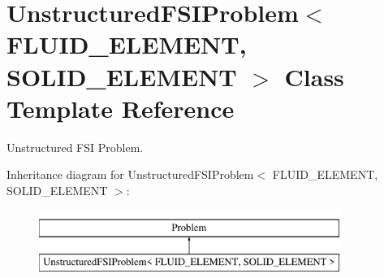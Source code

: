 \hypertarget{classUnstructuredFSIProblem}{}\section{Unstructured\+F\+S\+I\+Problem$<$ F\+L\+U\+I\+D\+\_\+\+E\+L\+E\+M\+E\+NT, S\+O\+L\+I\+D\+\_\+\+E\+L\+E\+M\+E\+NT $>$ Class Template Reference}
\label{classUnstructuredFSIProblem}


Unstructured F\+SI Problem.  


Inheritance diagram for Unstructured\+F\+S\+I\+Problem$<$ F\+L\+U\+I\+D\+\_\+\+E\+L\+E\+M\+E\+NT, S\+O\+L\+I\+D\+\_\+\+E\+L\+E\+M\+E\+NT $>$\+:\begin{figure}[H]
\begin{center}
\leavevmode
\includegraphics[height=2.000000cm]{classUnstructuredFSIProblem}
\end{center}
\end{figure}
